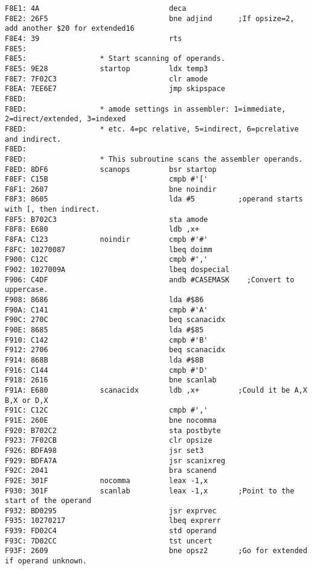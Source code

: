 {\begin{verbatim}
F8E1: 4A                              deca
F8E2: 26F5                            bne adjind      ;If opsize=2, add another $20 for extended16    
F8E4: 39                              rts
F8E5:                 
F8E5:                 * Start scanning of operands.
F8E5: 9E28            startop         ldx temp3
F8E7: 7F02C3                          clr amode
F8EA: 7EE6E7                          jmp skipspace
F8ED:                 
F8ED:                 * amode settings in assembler: 1=immediate, 2=direct/extended, 3=indexed
F8ED:                 * etc. 4=pc relative, 5=indirect, 6=pcrelative and indirect.
F8ED:                 
F8ED:                 * This subroutine scans the assembler operands.
F8ED: 8DF6            scanops         bsr startop
F8EF: C15B                            cmpb #'['
F8F1: 2607                            bne noindir
F8F3: 8605                            lda #5          ;operand starts with [, then indirect.
F8F5: B702C3                          sta amode       
F8F8: E680                            ldb ,x+
F8FA: C123            noindir         cmpb #'#'
F8FC: 10270087                        lbeq doimm
F900: C12C                            cmpb #','
F902: 1027009A                        lbeq dospecial
F906: C4DF                            andb #CASEMASK    ;Convert to uppercase.
F908: 8686                            lda #$86
F90A: C141                            cmpb #'A'
F90C: 270C                            beq scanacidx
F90E: 8685                            lda #$85
F910: C142                            cmpb #'B'
F912: 2706                            beq scanacidx
F914: 868B                            lda #$8B
F916: C144                            cmpb #'D'
F918: 2616                            bne scanlab
F91A: E680            scanacidx       ldb ,x+         ;Could it be A,X B,X or D,X
F91C: C12C                            cmpb #','
F91E: 260E                            bne nocomma
F920: B702C2                          sta postbyte
F923: 7F02CB                          clr opsize
F926: BDFA98                          jsr set3
F929: BDFA7A                          jsr scanixreg
F92C: 2041                            bra scanend
F92E: 301F            nocomma         leax -1,x               
F930: 301F            scanlab         leax -1,x       ;Point to the start of the operand
F932: BD0295                          jsr exprvec
F935: 10270217                        lbeq exprerr    
F939: FD02C4                          std operand
F93C: 7D02CC                          tst uncert
F93F: 2609                            bne opsz2       ;Go for extended if operand unknown.

\end{verbatim}}
